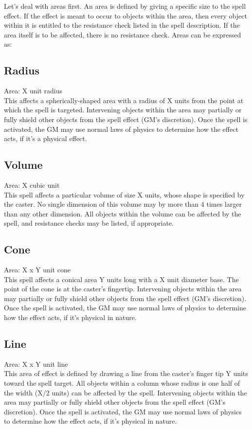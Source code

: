 Let's deal with areas first. An area is defined by giving a specific size to the spell effect. If the effect is meant to occur to objects within the area, then every object within it is entitled to the resistance check listed in the spell description. If the area itself is to be affected, there is no resistance check. Areas can be expressed as:
\subsection{Radius}
Area: X unit radius\\
This affects a spherically-shaped area with a radius of X units from the point at which the spell is targeted. Intervening objects within the area may partially or fully shield other objects from the spell effect (GM's discretion). Once the spell is activated, the GM may use normal laws of physics to determine how the effect acts, if it's a physical effect.
\subsection{Volume}
Area: X cubic unit\\
This spell affects a particular volume of size X units, whose shape is specified by the caster. No single dimension of this volume may by more than 4 times larger than any other dimension. All objects within the volume can be affected by the spell, and resistance checks may be listed, if appropriate.
\subsection{Cone}
Area: X x Y unit cone\\
This spell affects a conical area Y units long with a X unit diameter base. The point of the cone is at the caster's fingertip. Intervening objects within the area may partially or fully shield other objects from the spell effect (GM's discretion). Once the spell is activated, the GM may use normal laws of physics to determine how the effect acts, if it's physical in nature.
\subsection{Line}
Area: X x Y unit line\\
This area of effect is defined by drawing a line from the caster's finger tip Y units toward the spell target. All objects within a column whose radius is one half of the width (X/2 units) can be affected by the spell. Intervening objects within the area may partially or fully shield other objects from the spell effect (GM's discretion). Once the spell is activated, the GM may use normal laws of physics to determine how the effect acts, if it's physical in nature.
